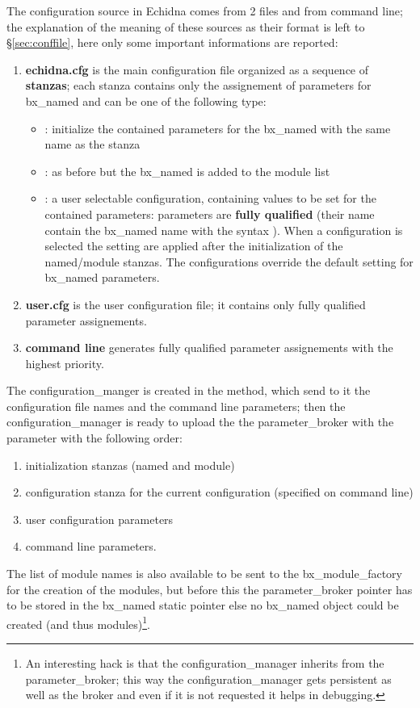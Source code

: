 The configuration source in Echidna comes from 2 files and from command line; the explanation of the meaning of these
sources as their format is left to \S\ref{sec:conffile}, here only some important informations are reported:
\begin{enumerate}
\item {\bf echidna.cfg} is the main configuration file organized as a sequence of {\bf stanzas}; each stanza contains 
only the assignement of parameters for bx\_named and can be one of the following type:
\begin{itemize}
\item {}: initialize the contained parameters for the bx\_named with the same name as the stanza
\item {}: as before but the bx\_named is added to the module list
\item {}: a user selectable configuration, containing values to be set for the contained parameters: parameters
are {\bf fully qualified} (their name contain the bx\_named name with the syntax ). 
When a configuration is selected the setting are applied after the initialization of the named/module stanzas. 
The configurations override the default setting for bx\_named parameters.
\end{itemize}
\item {\bf user.cfg} is the user configuration file; it contains only fully qualified parameter assignements.
\item {\bf command line} generates fully qualified parameter assignements with the highest priority.
\end{enumerate}

The configuration\_manger is created in the \mbox{} method, which send to it 
the configuration file names and the command line parameters; then the configuration\_manager is ready to upload the 
the parameter\_broker with the parameter with the following order:
\begin{enumerate}
\item initialization stanzas (named and module)
\item configuration stanza for the current configuration (specified on command line)
\item user configuration parameters
\item command line parameters.
\end{enumerate}
The list of module names is also available to be sent to the bx\_module\_factory for the creation of 
the modules, but before this the parameter\_broker pointer has to be stored in the bx\_named static pointer else
no bx\_named object could be created (and thus modules)\footnote{An interesting hack is that the configuration\_manager
inherits from the parameter\_broker; this way the configuration\_manager gets persistent as well as the broker and
even if it is not requested it helps in debugging.}.

